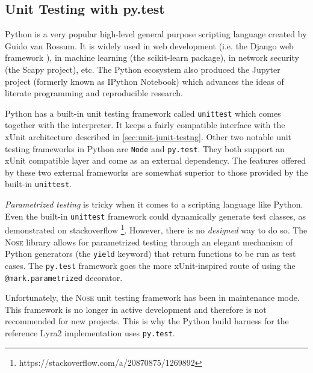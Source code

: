 \subsection{Unit Testing with py.test}
\label{sec:unit-pytest}

Python is a very popular high-level general purpose scripting language created by Guido van Rossum. It is widely used in web development (i.e. the Django web framework \cite{django:2017:homepage}), in machine learning (the scikit-learn package), in network security (the Scapy project), etc. The Python ecosystem also produced the Jupyter project (formerly known as IPython Notebook) which advances the ideas of literate programming and reproducible research.

Python has a built-in unit testing framework called \texttt{unittest} which comes together with the interpreter. It keeps a fairly compatible interface with the xUnit architecture described in \ref{sec:unit-junit-testng}. Other two notable unit testing frameworks in Python are \texttt{Node} and \texttt{py.test}. They both support an xUnit compatible layer and come as an external dependency. The features offered by these two external frameworks are somewhat superior to those provided by the built-in \texttt{unittest}.

\emph{Parametrized testing} is tricky when it comes to a scripting language like Python. Even the built-in \texttt{unittest} framework could dynamically generate test classes, as demonstrated on stackoverflow \footnote{https://stackoverflow.com/a/20870875/1269892}. However, there is no \emph{designed} way to do so. The \textsc{Nose} library allows for parametrized testing through an elegant mechanism of Python generators (the \texttt{yield} keyword) that return functions to be run as test cases. The \texttt{py.test} framework goes the more xUnit-inspired route of using the \texttt{@mark.parametrized} decorator.

Unfortunately, the \textsc{Nose} unit testing framework has been in maintenance mode. This framework is no longer in active development and therefore is not recommended for new projects. This is why the Python build harness for the reference Lyra2 implementation uses \texttt{py.test}.
